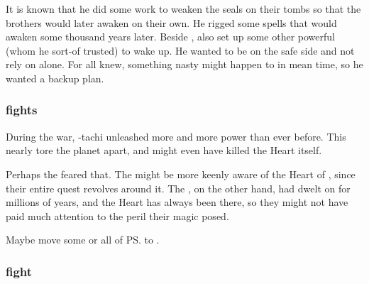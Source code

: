 It is known that he did some work to weaken the seals on their tombs so that the brothers would later awaken on their own.
He rigged some spells that would awaken \Nexagglachel some thousand years later.
Beside \Nexagglachel, \Sethicus also set up some other powerful \dragons (whom he sort-of trusted) to wake up. 
He wanted to be on the safe side and not rely on \Nexagglachel alone.
For all \Sethicus knew, something nasty might happen to \Nexagglachel in mean time, so he wanted a backup plan. 





\subsubsection{\Sethicus fights}
During the war, \Sethicus-tachi unleashed more \daemons{} and more \xzaishannic{} power than ever before. 
This nearly tore the planet apart, and might even have killed the Heart itself. 

Perhaps the \banes{} feared that. 
The \banes{} might be more keenly aware of the Heart of \Miith{}, since their entire quest revolves around it. 
The \ophidians, on the other hand, had dwelt on \Miith{} for millions of years, and the Heart has always been there, so they might not have paid much attention to the peril their magic posed. 


Maybe move some or all of \ps{\Kserasshana}  to \Sethicus. 





\subsubsection{\Dragons fight}

